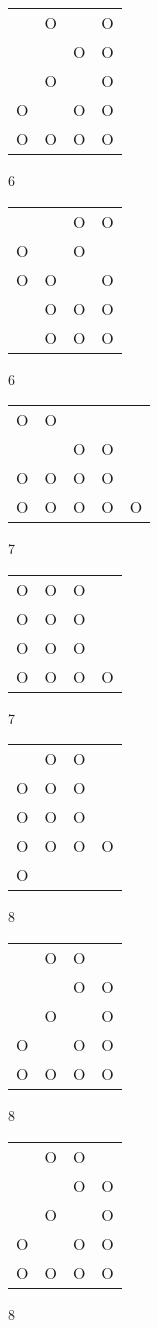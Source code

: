 \begin{tabular}{|m{0.2cm}m{0.2cm}m{0.2cm}m{0.2cm}|}\hline
 &O& &O\\
 & &O&O\\
 &O& &O\\
O& &O&O\\
O&O&O&O\\
\hline\end{tabular}6
\begin{tabular}{|m{0.2cm}m{0.2cm}m{0.2cm}m{0.2cm}|}\hline
 & &O&O\\
O& &O& \\
O&O& &O\\
 &O&O&O\\
 &O&O&O\\
\hline\end{tabular}6
\begin{tabular}{|m{0.2cm}m{0.2cm}m{0.2cm}m{0.2cm}m{0.2cm}|}\hline
O&O& & & \\
 & &O&O& \\
O&O&O&O& \\
O&O&O&O&O\\
\hline\end{tabular}7
\begin{tabular}{|m{0.2cm}m{0.2cm}m{0.2cm}m{0.2cm}|}\hline
O&O&O& \\
O&O&O& \\
O&O&O& \\
O&O&O&O\\
\hline\end{tabular}7
\begin{tabular}{|m{0.2cm}m{0.2cm}m{0.2cm}m{0.2cm}|}\hline
 &O&O& \\
O&O&O& \\
O&O&O& \\
O&O&O&O\\
O& & & \\
\hline\end{tabular}8
\begin{tabular}{|m{0.2cm}m{0.2cm}m{0.2cm}m{0.2cm}|}\hline
 &O&O& \\
 & &O&O\\
 &O& &O\\
O& &O&O\\
O&O&O&O\\
\hline\end{tabular}8
\begin{tabular}{|m{0.2cm}m{0.2cm}m{0.2cm}m{0.2cm}|}\hline
 &O&O& \\
 & &O&O\\
 &O& &O\\
O& &O&O\\
O&O&O&O\\
\hline\end{tabular}8
